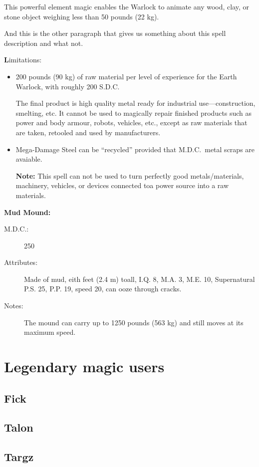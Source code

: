 \noindent
This powerful element magic enables
the Warlock to animate any wood,
clay, or stone object weighing
less than 50 pounds (22 kg).

And this is the other paragraph that
gives us something about this spell
description and what not.

\noindent
{\textbf Limitations:}
\begin{itemize}
\item 200 pounds (90 kg) of raw material
per level of experience for the Earth Warlock,
with roughly 200 S.D.C.

The final product is high quality metal ready for
industrial use---construction, smelting, etc.
It cannot be used to magically repair
finished products such as power and body armour,
robots, vehicles, etc., except as raw materials
that are taken, retooled and used by
manufacturers.
\item Mega-Damage Steel can
be ``recycled'' provided that
M.D.C.\ metal scraps are avaiable.

{\bfseries Note:} This spell can not be used to turn perfectly
good metals/materials, machinery, vehicles,
or devices connected toa  power
source into a raw materials.
\end{itemize}
{\bfseries Mud Mound:}
\begin{description}
\item[M.D.C.:] 250
\item[Attributes:]
Made of mud, eith feet (2.4 m) toall,
I.Q. 8, M.A. 3, M.E. 10, Supernatural P.S. 25,
P.P. 19, speed 20, can ooze through
cracks.
\item[Notes:] The mound can carry up to 1250 pounds (563 kg) and still
moves at its maximum speed.
\end{description}

\section{Legendary magic users}\label{sec:legendary-mages}

\subsection{Fick}

\subsection{Talon}

\subsection{Targz}

